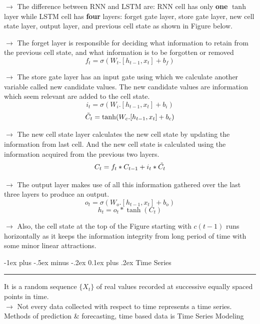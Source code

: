 \documentclass[letterpaper, 10.5pt,landscape]{article}
\makeatletter
\renewcommand{\section}{\@startsection{section}{1}{0mm}%
                                {-1ex plus -.5ex minus -.2ex}%
                                {0.1ex plus .2ex}%
                                {\normalfont\small}}
\makeatother
\begin{document}
\begin{multicols*}{3}
$\rightarrow$ The difference between RNN and LSTM are: RNN cell has only \textbf{one} $\tanh$ layer while LSTM cell has \textbf{four} layers: forget gate layer, store gate layer, new cell state layer, output layer, and previous cell state as shown in Figure below.

$\rightarrow$ The forget layer is responsible for deciding what information to retain from the previous cell state, and what information is to be forgotten or removed 
\[f_{t} = \sigma(W_{t}.[h_{t-1},x_{t}] + b_{f}) \]


$\rightarrow$ The store gate layer has an input gate using which we calculate another variable called new candidate values. The new candidate values are information which seem relevant are added to the cell state.
\[i_{t} = \sigma(W_{i}.[h_{t-1},x_{t}] + b_{i})\]
\[\Tilde{C}_{t} = \tanh(W_{c}.[h_{t-1},x_{t}] + b_{c})\]


$\rightarrow$ The new cell state layer calculates the new cell state by updating the information from last cell. And the new cell state is calculated using the information acquired from the previous two layers.
\[{C}_{t} = f_{t}*C_{t-1} + i_{t}*\Tilde{C_{t}}\]


$\rightarrow$ The output layer makes use of all this information gathered over the last three layers to produce an output.
\[o_{t} = \sigma(W_{o}.[h_{t-1},x_{t}] + b_{o})\]
\[h_{t} = o_{t}*\tanh(C_{t})\]


$\rightarrow$ Also, the cell state at the top of the Figure starting with $c({t-1})$ runs horizontally as it keeps the information integrity from long period of time with some minor linear attractions.  









\section{Time Series} {\color{teal}\hrule height 1pt} \smallskip
It is a random sequence $\{X_{t} \}$ of real values recorded at successive equally spaced points in time. \\

$\rightarrow$ Not every data collected with respect to time represents a time series. \\
\hspace{5pt} Methods of prediction \& forecasting, time based data is Time Series Modeling \\


\end{multicols*}
\end{document}
